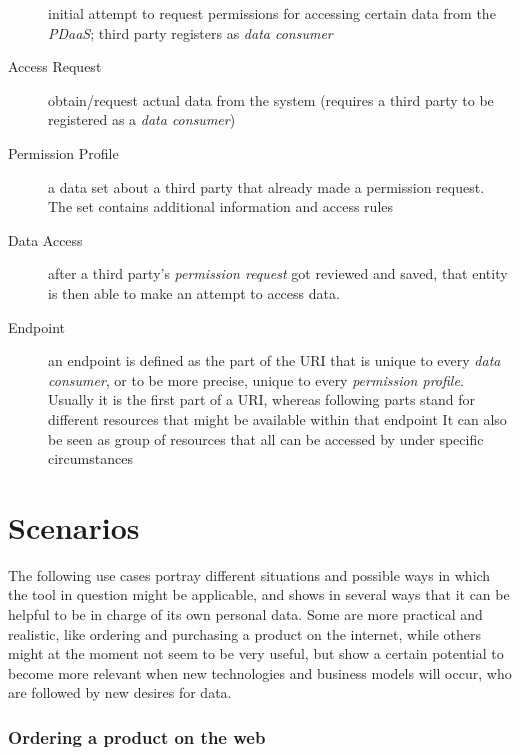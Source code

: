 \documentclass[12pt,english,a4paper,titlepage,cleardoublepage=empty,dottedtoc]{report}
\begin{document}
\begin{description}
initial attempt to request permissions for accessing certain data from
the \emph{PDaaS}; third party registers as \emph{data consumer}
\item[Access Request]
obtain/request actual data from the system (requires a third party to be
registered as a \emph{data consumer})
\item[Permission Profile]
a data set about a third party that already made a permission request.
The set contains additional information and access rules
\item[Data Access]
after a third party's \emph{permission request} got reviewed and saved,
that entity is then able to make an attempt to access data.
\item[Endpoint]
an endpoint is defined as the part of the URI that is unique to every
\emph{data consumer}, or to be more precise, unique to every
\emph{permission profile}. Usually it is the first part of a URI,
whereas following parts stand for different resources that might be
available within that endpoint It can also be seen as group of resources
that all can be accessed by under specific circumstances
\end{description}

\hypertarget{scenarios}{\section{Scenarios}\label{scenarios}}

The following use cases portray different situations and possible ways
in which the tool in question might be applicable, and shows in several
ways that it can be helpful to be in charge of its own personal data.
Some are more practical and realistic, like ordering and purchasing a
product on the internet, while others might at the moment not seem to be
very useful, but show a certain potential to become more relevant when
new technologies and business models will occur, who are followed by new
desires for data.

\subsubsection{Ordering a product on the
web}\label{ordering-a-product-on-the-web}
\end{document}

